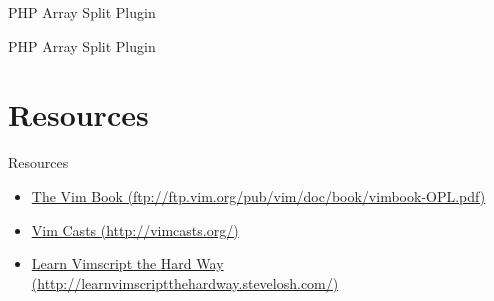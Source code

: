 \documentclass{beamer}
\begin{document}
    \lstPluginTwo{
        \begin{lstlisting}
  execute 'normal 0'
  " There isn't already a trailing comma
  if search('\v([^,])\]([^\]]*)$', '', line('.'))
    s/\v([^,])\]([^\]]*)$/\1,\r\]\2/e
  else
    s/\v,\]([^\]]*)$/,\r\]\1/e
  endif
  silent normal =a]
endfunction
        \end{lstlisting}
    }
    \begin{frame}{PHP Array Split Plugin}
        \lstPluginOne
    \end{frame}
    \begin{frame}{PHP Array Split Plugin}
        \lstPluginTwo
    \end{frame}
    \section{Resources}
    \begin{frame}{Resources}
        \begin{itemize}
            \item \href{ftp://ftp.vim.org/pub/vim/doc/book/vimbook-OPL.pdf}{The Vim Book (ftp://ftp.vim.org/pub/vim/doc/book/vimbook-OPL.pdf)}
            \item \href{http://vimcasts.org/}{Vim Casts (http://vimcasts.org/)}
            \item \href{http://learnvimscriptthehardway.stevelosh.com/}{Learn Vimscript the Hard Way (http://learnvimscriptthehardway.stevelosh.com/)}
        \end{itemize}
    \end{frame}
\end{document}

